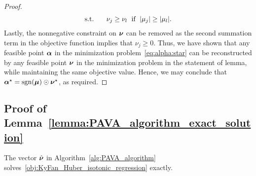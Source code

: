 \begin{proof}
\begin{align*}
\begin{array}{cl}
            \operatorname{s.\!t.\!} & \quad \nu_j \geq \nu_l \; \text{ if } \; \lvert \mu_j \rvert \geq \lvert \mu_l \rvert.
        \end{array} 
    \end{align*}
    Lastly, the nonnegative constraint on $\bm{\nu}$ can be removed as the second summation term in the objective function implies that $\nu_j \geq 0$. Thus, we have shown that any feasible point $\bm{\alpha}$ in the minimization problem~\eqref{eq:alpha:star} can be reconstructed by any feasible point $\bm{\nu}$ in the minimization problem in the statement of lemma, while maintaining the same objective value. Hence, we may conclude that $\bm{\alpha}^\star = \operatorname{sgn}(\bm{\mu}) \odot \bm{\nu}^\star$, as required.
\end{proof}

\subsection{Proof of Lemma~\ref{lemma:PAVA_algorithm_exact_solution}}







\begin{namedlemma}
    [~\ref{lemma:PAVA_algorithm_exact_solution}]
    The vector $\hat {\bm{\nu}}$ in Algorithm~\ref{alg:PAVA_algorithm} solves~\eqref{obj:KyFan_Huber_isotonic_regression} exactly.
\end{namedlemma}

